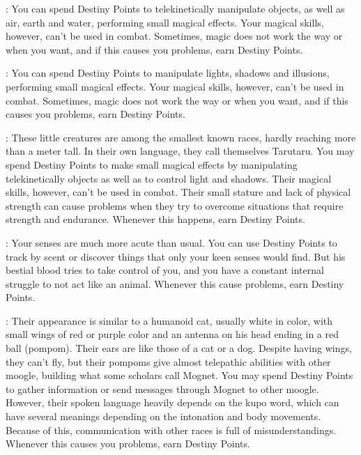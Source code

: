 \begin{multicols}{2}
\begin{ffcolpage}
: You can spend Destiny Points to telekinetically manipulate objects, as well as air, earth and water, performing small magical effects. Your magical skills, however, can’t be used in combat. Sometimes, magic does not work the way or when you want, and if this causes you problems, earn Destiny Points.
\end{ffcolpage} \pw

\begin{ffcolpage}
: You can spend Destiny Points to manipulate lights, shadows and illusions, performing small magical effects. Your magical skills, however, can’t be used in combat. Sometimes, magic does not work the way or when you want, and if this causes you problems, earn Destiny Points.
\end{ffcolpage} \pw

\noindent\begin{minipage}{.35\textwidth-2\columnsep}
: These little creatures are among the smallest known races, hardly reaching more than a meter tall. In their own language, they call themselves Tarutaru. You may spend Destiny Points to make small magical effects by manipulating telekinetically objects as well as to control light and shadows. Their magical skills, however, can’t be used in combat. Their small stature and lack of physical strength can cause problems when they try to overcome situations that require strength and endurance. Whenever this happens, earn Destiny Points.
\end{minipage} \pw

\begin{ffcolpage}
: Your senses are much more acute than usual. You can use Destiny Points to track by scent or discover things that only your keen senses would find. But his bestial blood tries to take control of you, and you have a constant internal struggle to not act like an animal. Whenever this cause problems, earn Destiny Points.
\end{ffcolpage} \pw

\noindent{}
\begin{minipage}{.35\textwidth-2\columnsep}
: Their appearance is similar to a humanoid cat, usually white in color, with small wings of red or purple color and an antenna on his head ending in a red ball (pompom). Their ears are like those of a cat or a dog. Despite having wings, they can't fly, but their pompoms give almost telepathic abilities with other moogle, building what some scholars call Mognet. You may spend Destiny Points to gather information or send messages through Mognet to other moogle. However, their spoken language heavily depends on the kupo word, which can have several meanings depending on the intonation and body movements. Because of this, communication with other races is full of misunderstandings. Whenever this causes you problems, earn Destiny Points.
\end{minipage} \pw


\end{multicols}
